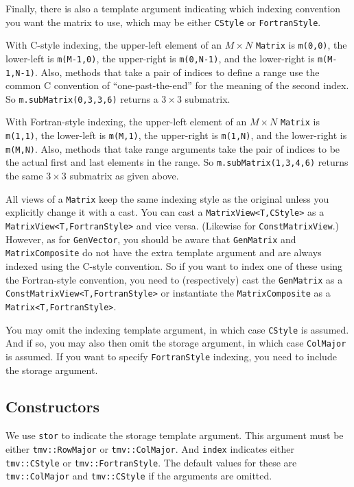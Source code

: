 \documentclass[twoside,letterpaper,11pt]{article}
\renewcommand{\tt}[1]{{\lstinline {#1}}}
\begin{document}
Finally, there is also a template argument indicating which indexing convention
you want the matrix to use, which may be either \tt{CStyle} or 
\tt{FortranStyle}.

With C-style indexing, the upper-left element of an $M \times N$ \tt{Matrix} is
\tt{m(0,0)}, the lower-left is \tt{m(M-1,0)}, the upper-right is \tt{m(0,N-1)},
and the lower-right is \tt{m(M-1,N-1)}.  Also, methods that take a pair of 
indices to define a range use the common C convention of ``one-past-the-end'' 
for the meaning of the second index.
So \tt{m.subMatrix(0,3,3,6)} returns a $3 \times 3$ submatrix.

With Fortran-style indexing, the upper-left element of an $M \times N$ \tt{Matrix}
is \tt{m(1,1)}, the lower-left is \tt{m(M,1)}, the upper-right is \tt{m(1,N)},
and the lower-right is \tt{m(M,N)}.  Also, methods that take range arguments
take the pair of indices to be the actual first and last elements in the range.
So \tt{m.subMatrix(1,3,4,6)} returns the same $3 \times 3$ submatrix as given above.

All views of a \tt{Matrix} keep the same indexing style as the original unless you
explicitly change it with a cast.  You can cast a \tt{MatrixView<T,CStyle>}
as a \tt{MatrixView<T,FortranStyle>} and vice versa.  (Likewise for 
\tt{ConstMatrixView}.)  However, as for \tt{GenVector}, you should be
aware that \tt{GenMatrix}
and \tt{MatrixComposite} do not have the extra template argument and are always
indexed using the C-style convention.  So if you want to index one of these 
using the Fortran-style convention, you need to (respectively) cast the 
\tt{GenMatrix} as a \tt{ConstMatrixView<T,FortranStyle>} or instantiate the
\tt{MatrixComposite} as a \tt{Matrix<T,FortranStyle>}.

You may omit the indexing template argument, in which case \tt{CStyle} is assumed.
And if so, you may also then omit the storage argument, in which case \tt{ColMajor}
is assumed.  If you want to specify \tt{FortranStyle} indexing, you need
to include the storage argument.

\subsection{Constructors}
\label{Matrix_Constructors}

We use \tt{stor} to indicate the storage template argument. 
This argument must be either 
\tt{tmv::RowMajor} or \tt{tmv::ColMajor}.  And \tt{index} indicates either 
\tt{tmv::CStyle} or \tt{tmv::FortranStyle}.  The default values for these
are \tt{tmv::ColMajor} and \tt{tmv::CStyle} if the arguments are omitted.
\end{document}
